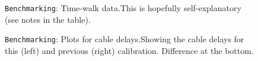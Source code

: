 \documentclass[12pt]{article}
\begin{document}
\begin{figure}
\centering
\noindent{}
  \caption{\centering \texttt{Benchmarking}: Time-walk data.\hspace{\textwidth}This is hopefully self-explanatory (see notes in the table).}
  \label{fig:bench3}
\end{figure}

\begin{figure}
\centering
\noindent{}
  \caption{\centering \texttt{Benchmarking}: Plots for cable delays.\hspace{\textwidth}Showing the cable delays for this (left) and previous (right) calibration. Difference at the bottom.}
  \label{fig:bench4}
\end{figure}
\end{document}
